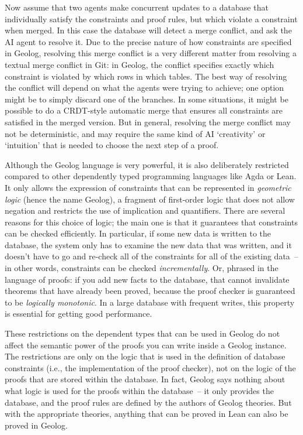 \documentclass{article}
\begin{document}
Now assume that two agents make concurrent updates to a database that individually satisfy the constraints and proof rules, but which violate a constraint when merged.
In this case the database will detect a merge conflict, and ask the AI agent to resolve it.
Due to the precise nature of how constraints are specified in Geolog, resolving this merge conflict is a very different matter from resolving a textual merge conflict in Git: in Geolog, the conflict specifies exactly which constraint is violated by which rows in which tables.
The best way of resolving the conflict will depend on what the agents were trying to achieve; one option might be to simply discard one of the branches.
In some situations, it might be possible to do a CRDT-style automatic merge that ensures all constraints are satisfied in the merged version.
But in general, resolving the merge conflict may not be deterministic, and may require the same kind of AI `creativity' or `intuition' that is needed to choose the next step of a proof.

Although the Geolog language is very powerful, it is also deliberately restricted compared to other dependently typed programming languages like Agda or Lean.
It only allows the expression of constraints that can be represented in \emph{geometric logic} (hence the name Geolog), a fragment of first-order logic that does not allow negation and restricts the use of implication and quantifiers.
There are several reasons for this choice of logic; the main one is that it guarantees that constraints can be checked efficiently.
In particular, if some new data is written to the database, the system only has to examine the new data that was written, and it doesn't have to go and re-check all of the constraints for all of the existing data~-- in other words, constraints can be checked \emph{incrementally}.
Or, phrased in the language of proofs: if you add new facts to the database, that cannot invalidate theorems that have already been proved, because the proof checker is guaranteed to be \emph{logically monotonic}.
In a large database with frequent writes, this property is essential for getting good performance.

These restrictions on the dependent types that can be used in Geolog do not affect the semantic power of the proofs you can write inside a Geolog instance.
The restrictions are only on the logic that is used in the definition of database constraints (i.e., the implementation of the proof checker), not on the logic of the proofs that are stored within the database.
In fact, Geolog says nothing about what logic is used for the proofs within the database~-- it only provides the database, and the proof rules are defined by the authors of Geolog theories.
But with the appropriate theories, anything that can be proved in Lean can also be proved in Geolog.
\end{document}
